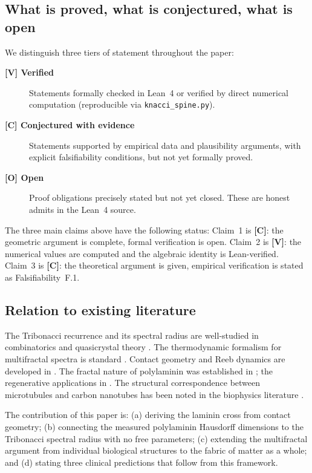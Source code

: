 \documentclass[12pt,a4paper]{article}
\begin{document}
\subsection{What is proved, what is conjectured, what is open}

We distinguish three tiers of statement throughout the paper:

\begin{description}
\item[\textbf{[V] Verified}] Statements formally checked in Lean~4 or
  verified by direct numerical computation (reproducible via
  \texttt{knacci\_spine.py}).

\item[\textbf{[C] Conjectured with evidence}] Statements supported by
  empirical data and plausibility arguments, with explicit falsifiability
  conditions, but not yet formally proved.

\item[\textbf{[O] Open}] Proof obligations precisely stated but not yet
  closed. These are honest admits in the Lean~4 source.
\end{description}

The three main claims above have the following status:
Claim~1 is \textbf{[C]}: the geometric argument is complete, formal
verification is open. Claim~2 is \textbf{[V]}: the numerical values are
computed and the algebraic identity is Lean-verified. Claim~3 is
\textbf{[C]}: the theoretical argument is given, empirical verification
is stated as Falsifiability~F.1.

\subsection{Relation to existing literature}

The Tribonacci recurrence and its spectral radius are well-studied in
combinatorics and quasicrystal theory \cite{luck1993,damanik2007}. The
thermodynamic formalism for multifractal spectra is standard
\cite{pesin1997}. Contact geometry and Reeb dynamics are developed in
\cite{geiges2008}. The fractal nature of polylaminin was established in
\cite{hochman2014}; the regenerative applications in \cite{sampaio2025}.
The structural correspondence between microtubules and carbon nanotubes
has been noted in the biophysics literature \cite{hameroff2014}.

The contribution of this paper is: (a) deriving the laminin cross from
contact geometry; (b) connecting the measured polylaminin Hausdorff
dimensions to the Tribonacci spectral radius with no free parameters;
(c) extending the multifractal argument from individual biological
structures to the fabric of matter as a whole; and (d) stating three
clinical predictions that follow from this framework.
\end{document}
